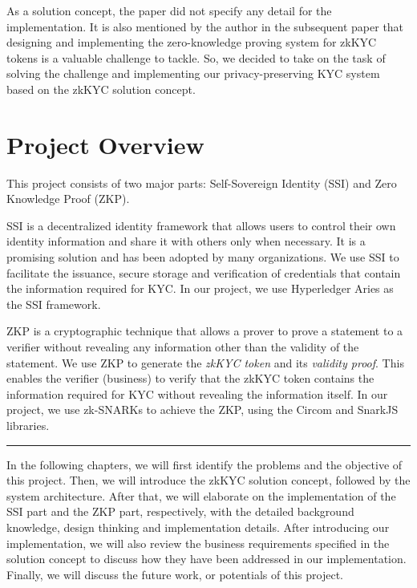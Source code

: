 \documentclass[
]{report}
\begin{document}
As a solution concept, the paper did not specify any detail for the
implementation. It is also mentioned by the author in the subsequent
paper that designing and implementing the zero-knowledge proving system
for zkKYC tokens is a valuable challenge to tackle. So, we decided to
take on the task of solving the challenge and implementing our
privacy-preserving KYC system based on the zkKYC solution concept.

\section{Project Overview}

This project consists of two major parts: Self-Sovereign
Identity (SSI) and Zero Knowledge Proof (ZKP).

SSI is a decentralized identity framework that allows users to control
their own identity information and share it with others only when
necessary. It is a promising solution and has been adopted by many
organizations. We use SSI to facilitate the issuance, secure storage and
verification of credentials that contain the information required for
KYC. In our project, we use Hyperledger Aries as the SSI framework.

ZKP is a cryptographic technique that allows a prover to prove a
statement to a verifier without revealing any information other than the
validity of the statement. We use ZKP to generate the \emph{zkKYC token}
and its \emph{validity proof}. This enables the verifier (business) to
verify that the zkKYC token contains the information required for KYC
without revealing the information itself. In our project, we use
zk-SNARKs to achieve the ZKP, using the Circom and SnarkJS libraries.

\begin{center}\rule{0.5\linewidth}{0.5pt}\end{center}

In the following chapters, we will first identify the problems and the
objective of this project. Then, we will introduce the zkKYC solution
concept, followed by the system architecture. After that, we will
elaborate on the implementation of the SSI part and the ZKP part,
respectively, with the detailed background knowledge, design thinking
and implementation details. After introducing our implementation, we
will also review the business requirements specified in the solution
concept to discuss how they have been addressed in our implementation.
Finally, we will discuss the future work, or potentials of this project.
\end{document}
